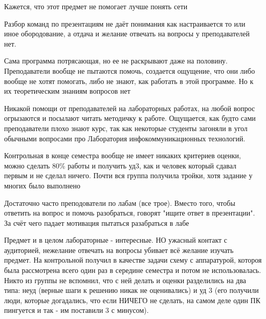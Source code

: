             \begin{commentbox} 
                Кажется, что этот предмет не помогает лучше понять сети 
            \end{commentbox} 
        
            \begin{commentbox} 
                Разбор команд по презентациям не даёт понимания как настраивается то или иное обородование, а отдача и желание отвечать на вопросы у преподавателей нет. 
            \end{commentbox} 
        
            \begin{commentbox} 
                Сама программа потрясающая, но ее не раскрывают даже на половину. Преподаватели вообще не пытаются помочь, создается ощущение, что они либо вообще не хотят помогать, либо не знают, как работать в этой программе. Но к их теоретическим знаниям вопросов нет 
            \end{commentbox} 
        
            \begin{commentbox} 
                Никакой помощи от преподавателей на лабораторных работах, на любой вопрос огрызаются и посылают читать методичку к работе. Ощущается, как будто сами преподаватели плохо знают курс, так как некоторые студенты загоняли в угол обычными вопросами про Лаборатория инфокоммуникационных технологий.

                Контрольная в конце семестра вообще не имеет никаких критериев оценки, можно сделать 80\% работы и получить уд3, как и человек который сдавал первым и не сделал ничего. Почти вся группа получила тройки, хотя задание у многих было выполнено 
            \end{commentbox} 
        
            \begin{commentbox} 
                Достаточно часто преподователи по лабам (все трое). Вместо того, чтобы ответить на вопрос и помочь разобраться, говорят "ищите ответ в презентации". За счёт чего падает мотивация пытаться разабраться в лабе  
            \end{commentbox} 
        
            \begin{commentbox} 
                Предмет и в целом лабораторные - интересные. НО ужасный контакт с аудиторией, нежелание отвечать на вопросы убивает всё желание изучать предмет. На контрольной получил в качестве задачи схему с аппаратурой, котороя была рассмотрена всего один раз в середине семестра и потом не использовалась. Никто из группы не вспомнил, что с ней делать и оценки разделились на два типа: неуд (верные шаги к решению никак не оценивались) и уд 3 (его получили люди, которые догадались, что если НИЧЕГО не сделать, на самом деле один ПК пингуется и так - им поставили 3 с минусом).  
            \end{commentbox} 
        
